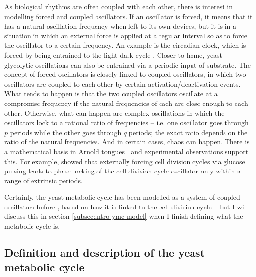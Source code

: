 As biological rhythms are often coupled with each other, there is interest in modelling forced and coupled oscillators.
If an oscillator is forced, it means that it has a natural oscillation frequency when left to its own devices, but it is in a situation in which an external force is applied at a regular interval so as to force the oscillator to a certain frequency.
An example is the circadian clock, which is forced by being entrained to the light-dark cycle \parencite{goldbeterMultisynchronizationOtherPatterns}.
Closer to home, yeast glycolytic oscillations can also be entrained via a periodic input of substrate.
The concept of forced oscillators is closely linked to coupled oscillators, in which two oscillators are coupled to each other by certain activation/deactivation events.
What tends to happen is that the two coupled oscillators oscillate at a compromise frequency if the natural frequencies of each are close enough to each other.
Otherwise, what can happen are complex oscillations in which the oscillators lock to a rational ratio of frequencies -- i.e. one oscillator goes through $p$ periods while the other goes through $q$ periods; the exact ratio depends on the ratio of the natural frequencies.
And in certain cases, chaos can happen.
There is a mathematical basis in Arnold tongues \citep{heltbergTaleTwoRhythms2021}, and experimental observations support this.
For example, \citep{charvinForcedPeriodicExpression2009} showed that externally forcing cell division cycles via glucose pulsing leads to phase-locking of the cell division cycle oscillator only within a range of extrinsic periods.

Certainly, the yeast metabolic cycle has been modelled as a system of coupled oscillators before \citep{papagiannakisAutonomousMetabolicOscillations2017,ozsezenInferenceHighLevelInteraction2019}, based on how it is linked to the cell division cycle -- but I will discuss this in section \ref{subsec:intro-ymc-model} when I finish defining what the metabolic cycle is.

\subsection{Definition and description of the yeast metabolic cycle}
\label{subsec:intro-ymc-definition}

